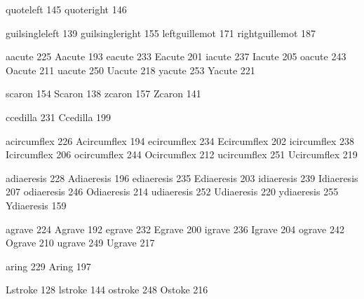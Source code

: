  quoteleft        145
 quoteright       146

 guilsingleleft   139
 guilsingleright  155
 leftguillemot    171
 rightguillemot   187

 aacute           225
 Aacute           193
 eacute           233
 Eacute           201
 iacute           237
 Iacute           205
 oacute           243
 Oacute           211
 uacute           250
 Uacute           218
 yacute           253
 Yacute           221

 scaron           154
 Scaron           138
 zcaron           157
 Zcaron           141

 ccedilla         231
 Ccedilla         199

 acircumflex      226
 Acircumflex      194
 ecircumflex      234
 Ecircumflex      202
 icircumflex      238
 Icircumflex      206
 ocircumflex      244
 Ocircumflex      212
 ucircumflex      251
 Ucircumflex      219

 adiaeresis       228
 Adiaeresis       196
 ediaeresis       235
 Ediaeresis       203
 idiaeresis       239
 Idiaeresis       207
 odiaeresis       246
 Odiaeresis       214
 udiaeresis       252
 Udiaeresis       220
 ydiaeresis       255
 Ydiaeresis       159

 agrave           224
 Agrave           192
 egrave           232
 Egrave           200
 igrave           236
 Igrave           204
 ograve           242
 Ograve           210
 ugrave           249
 Ugrave           217

 aring            229
 Aring            197

 Lstroke          128
 lstroke          144
 ostroke          248
 Ostoke           216

